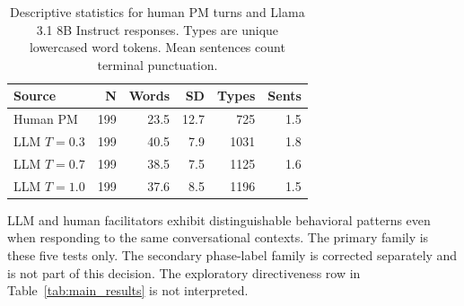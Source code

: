 \documentclass[11pt]{article}
\begin{document}
\begin{table}[htbp]
\caption{Descriptive statistics for human PM turns and Llama 3.1 8B Instruct responses. Types are unique lowercased word tokens. Mean sentences count terminal punctuation.}
\label{tab:descriptive}
\centering
\small
\begin{tabular}{lrrrrr}
\toprule
\textbf{Source} & \textbf{N} & \textbf{Words} & \textbf{SD} & \textbf{Types} & \textbf{Sents} \\
\midrule
Human PM & 199 & 23.5 & 12.7 &  725 & 1.5 \\
LLM $T=0.3$ & 199 & 40.5 &  7.9 & 1031 & 1.8 \\
LLM $T=0.7$ & 199 & 38.5 &  7.5 & 1125 & 1.6 \\
LLM $T=1.0$ & 199 & 37.6 &  8.5 & 1196 & 1.5 \\
\bottomrule
\end{tabular}
\end{table}

LLM and human facilitators exhibit distinguishable behavioral patterns even when responding to the same conversational contexts. The primary family is these five tests only. The secondary phase-label family is corrected separately and is not part of this decision. The exploratory directiveness row in Table~\ref{tab:main_results} is not interpreted.
\end{document}
